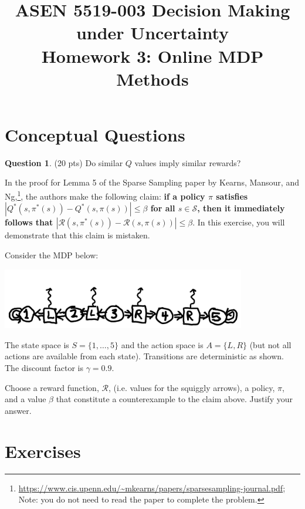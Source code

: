 \documentclass{article}
\title{ASEN 5519-003 Decision Making under Uncertainty\\
       Homework 3: Online MDP Methods}
\theoremstyle{definition}
\newtheorem{question}[thm]{Question}
\begin{document}
\maketitle

\section{Conceptual Questions}

\begin{question}
    (20 pts) Do similar $Q$ values imply similar rewards?

    In the proof for Lemma 5 of the Sparse Sampling paper by Kearns, Mansour, and Ng,\footnote{\url{https://www.cis.upenn.edu/~mkearns/papers/sparsesampling-journal.pdf}; Note: you do not need to read the paper to complete the problem.}, the authors make the following claim: \textbf{if a policy $\pi$ satisfies $|Q^*(s, \pi^*(s)) - Q^*(s, \pi(s))| \leq \beta$ for all $s \in \mathcal{S}$, then it immediately follows that $|\mathcal{R}(s, \pi^*(s)) - \mathcal{R}(s, \pi(s))| \leq \beta$}. In this exercise, you will demonstrate that this claim is mistaken.
    
    Consider the MDP below:
    \begin{center}
        \includegraphics[width=0.8\textwidth]{hand_mdp.pdf}
    \end{center}
    The state space is $S = \{1, \ldots, 5\}$ and the action space is $A = \{L, R\}$ (but not all actions are available from each state). Transitions are deterministic as shown. The discount factor is $\gamma=0.9$.

    Choose a reward function, $\mathcal{R}$, (i.e. values for the squiggly arrows), a policy, $\pi$, and a value $\beta$ that constitute a counterexample to the claim above. Justify your answer.
\end{question}

\section{Exercises}
\end{document}
